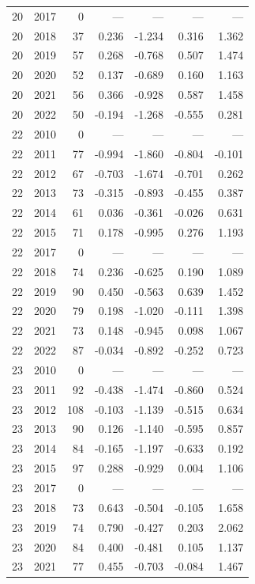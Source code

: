 \begin{longtable}{llrrrrr}
20 & 2017 & 0 & --- & --- & --- & --- \\
20 & 2018 & 37 & 0.236 & -1.234 & 0.316 & 1.362 \\
20 & 2019 & 57 & 0.268 & -0.768 & 0.507 & 1.474 \\
20 & 2020 & 52 & 0.137 & -0.689 & 0.160 & 1.163 \\
20 & 2021 & 56 & 0.366 & -0.928 & 0.587 & 1.458 \\
20 & 2022 & 50 & -0.194 & -1.268 & -0.555 & 0.281 \\
22 & 2010 & 0 & --- & --- & --- & --- \\
22 & 2011 & 77 & -0.994 & -1.860 & -0.804 & -0.101 \\
22 & 2012 & 67 & -0.703 & -1.674 & -0.701 & 0.262 \\
22 & 2013 & 73 & -0.315 & -0.893 & -0.455 & 0.387 \\
22 & 2014 & 61 & 0.036 & -0.361 & -0.026 & 0.631 \\
22 & 2015 & 71 & 0.178 & -0.995 & 0.276 & 1.193 \\
22 & 2017 & 0 & --- & --- & --- & --- \\
22 & 2018 & 74 & 0.236 & -0.625 & 0.190 & 1.089 \\
22 & 2019 & 90 & 0.450 & -0.563 & 0.639 & 1.452 \\
22 & 2020 & 79 & 0.198 & -1.020 & -0.111 & 1.398 \\
22 & 2021 & 73 & 0.148 & -0.945 & 0.098 & 1.067 \\
22 & 2022 & 87 & -0.034 & -0.892 & -0.252 & 0.723 \\
23 & 2010 & 0 & --- & --- & --- & --- \\
23 & 2011 & 92 & -0.438 & -1.474 & -0.860 & 0.524 \\
23 & 2012 & 108 & -0.103 & -1.139 & -0.515 & 0.634 \\
23 & 2013 & 90 & 0.126 & -1.140 & -0.595 & 0.857 \\
23 & 2014 & 84 & -0.165 & -1.197 & -0.633 & 0.192 \\
23 & 2015 & 97 & 0.288 & -0.929 & 0.004 & 1.106 \\
23 & 2017 & 0 & --- & --- & --- & --- \\
23 & 2018 & 73 & 0.643 & -0.504 & -0.105 & 1.658 \\
23 & 2019 & 74 & 0.790 & -0.427 & 0.203 & 2.062 \\
23 & 2020 & 84 & 0.400 & -0.481 & 0.105 & 1.137 \\
23 & 2021 & 77 & 0.455 & -0.703 & -0.084 & 1.467 \\

\end{longtable}
